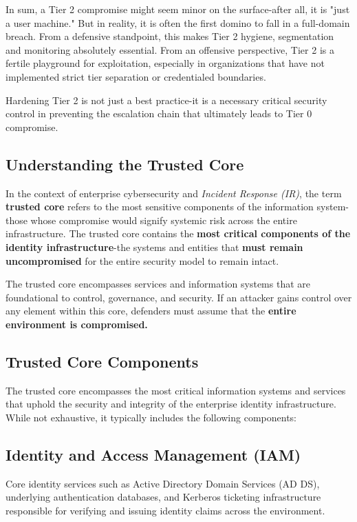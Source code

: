 \begin{itemize}
In sum, a Tier 2 compromise might seem minor on the surface-after all, it is "just a user machine." But in reality, it is often the first domino to fall in a full-domain breach. From a defensive standpoint, this makes Tier 2 hygiene, segmentation and monitoring absolutely essential. From an offensive perspective, Tier 2 is a fertile playground for exploitation, especially in organizations that have not implemented strict tier separation or credentialed boundaries.

Hardening Tier 2 is not just a best practice-it is a necessary critical security control in preventing the escalation chain that ultimately leads to Tier 0 compromise.

\subsection{Understanding the Trusted Core}
In the context of enterprise cybersecurity and \textit{Incident Response (IR)}, the term \textbf{trusted core} refers to the most sensitive components of the information system-those whose compromise would signify systemic risk across the entire infrastructure. The trusted core contains the \textbf{most critical components of the identity infrastructure}-the systems and entities that \textbf{must remain uncompromised} for the entire security model to remain intact.

The trusted core encompasses services and information systems that are foundational to control, governance, and security. If an attacker gains control over any element within this core, defenders must assume that the \textbf{entire environment is compromised.}

\subsection{Trusted Core Components}
The trusted core encompasses the most critical information systems and services that uphold the security and integrity of the enterprise identity infrastructure. While not exhaustive, it typically includes the following components:

\subsection{Identity and Access Management (IAM)}
Core identity services such as Active Directory Domain Services (AD DS), underlying authentication databases, and Kerberos ticketing infrastructure responsible for verifying and issuing identity claims across the environment.


\end{itemize}
